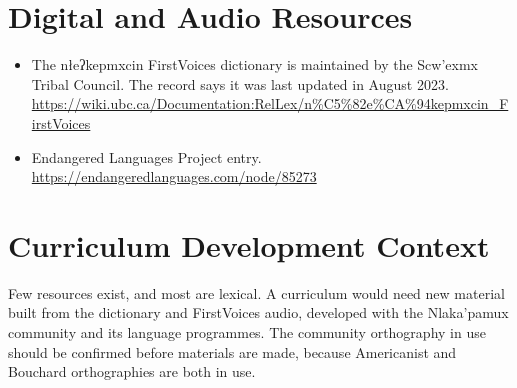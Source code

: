 \documentclass[12pt]{article}
\begin{document}
\section{Digital and Audio Resources}
\begin{itemize}
\item The nłeʔkepmxcin FirstVoices dictionary is maintained by the Scw'exmx Tribal Council. The record says it was last updated in August 2023. \url{https://wiki.ubc.ca/Documentation:RelLex/n%C5%82e%CA%94kepmxcin_FirstVoices}
\item Endangered Languages Project entry. \url{https://endangeredlanguages.com/node/85273}
\end{itemize}

\section{Curriculum Development Context}
Few resources exist, and most are lexical. A curriculum would need new material built from the dictionary and FirstVoices audio, developed with the Nlaka'pamux community and its language programmes. The community orthography in use should be confirmed before materials are made, because Americanist and Bouchard orthographies are both in use.
\end{document}
